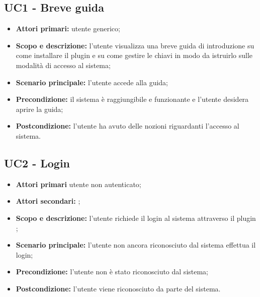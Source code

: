 \documentclass[AnalisiDeiRequisiti.tex]{subfiles}
\begin{document}
\subsection{UC1 - Breve guida}
\begin{itemize}
	\item \textbf{Attori primari:} utente generico;\\
	\item \textbf{Scopo e descrizione:} l'utente visualizza una breve guida di introduzione su come installare il plugin  e su come gestire le chiavi in modo da istruirlo sulle modalità di accesso al sistema;\\
	\item \textbf{Scenario principale:} l'utente accede alla guida;\\
	\item \textbf{Precondizione:} il sistema è raggiungibile e funzionante e l'utente desidera aprire la guida;\\
	\item \textbf{Postcondizione:} l'utente ha avuto delle nozioni riguardanti l'accesso al sistema.\\
\end{itemize}
\subsection{UC2 - Login}
\begin{itemize}
	\item \textbf{Attori primari} utente non autenticato;\\
	\item \textbf{Attori secondari:} ;
	\item \textbf{Scopo e descrizione:} l'utente richiede il login al sistema attraverso il plugin ;\\
	\item \textbf{Scenario principale:} l'utente non ancora riconosciuto dal sistema effettua il login;\\
	\item \textbf{Precondizione:} l'utente non è stato riconosciuto dal sistema;\\
	\item \textbf{Postcondizione:} l'utente viene riconosciuto da parte del sistema.\\
\end{itemize}
\end{document}
